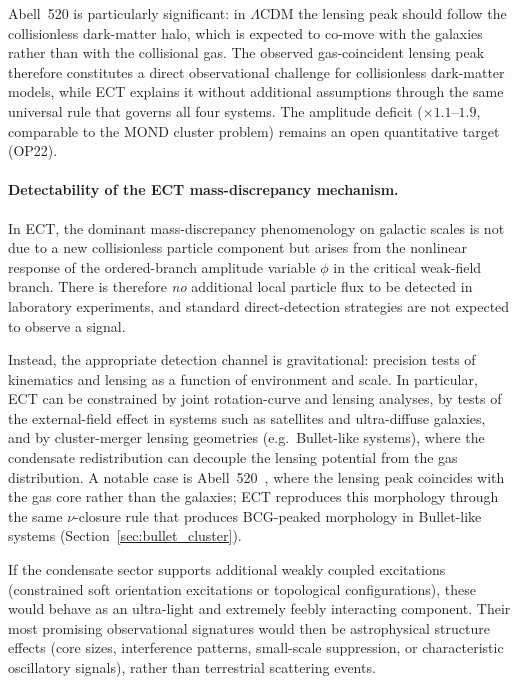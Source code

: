 \documentclass[11pt,a4paper]{article}
\numberwithin{equation}{section}
\begin{document}
Abell~520 is particularly significant: in $\Lambda$CDM the lensing peak
should follow the collisionless dark-matter halo, which is expected to
co-move with the galaxies rather than with the collisional gas.
The observed gas-coincident lensing peak therefore constitutes a
direct observational challenge for collisionless dark-matter models,
while ECT explains it without additional assumptions through the
same universal rule that governs all four systems.
The amplitude deficit ($\times1.1$--$1.9$, comparable to the MOND
cluster problem) remains an open quantitative target (OP22).

\paragraph{Detectability of the ECT mass-discrepancy mechanism.}

In ECT, the dominant mass-discrepancy phenomenology on galactic scales is not
due to a new collisionless particle component but arises from the
nonlinear response of the ordered-branch amplitude variable $\phi$ in the
critical weak-field branch.  There is therefore \emph{no} additional
local particle flux to be detected in laboratory experiments, and
standard direct-detection strategies are not expected to observe
a signal.

Instead, the appropriate detection channel is gravitational: precision
tests of kinematics and lensing as a function of environment and scale.
In particular, ECT can be constrained by joint rotation-curve and
lensing analyses, by tests of the external-field effect in systems such
as satellites and ultra-diffuse galaxies, and by cluster-merger lensing
geometries (e.g.\ Bullet-like systems), where the condensate
redistribution can decouple the lensing potential from the gas
distribution.
A notable case is Abell~520~\cite{Mahdavi2007,Jee2012}, where the
lensing peak coincides with the gas core rather than the galaxies;
ECT reproduces this morphology through the same $\nu$-closure rule
that produces BCG-peaked morphology in Bullet-like systems
(Section~\ref{sec:bullet_cluster}).

If the condensate sector supports additional weakly coupled excitations
(constrained soft orientation excitations or topological configurations), these would behave
as an ultra-light and extremely feebly interacting component. Their most
promising observational signatures would then be astrophysical
structure effects (core sizes, interference patterns, small-scale
suppression, or characteristic oscillatory signals), rather than
terrestrial scattering events.
\end{document}
